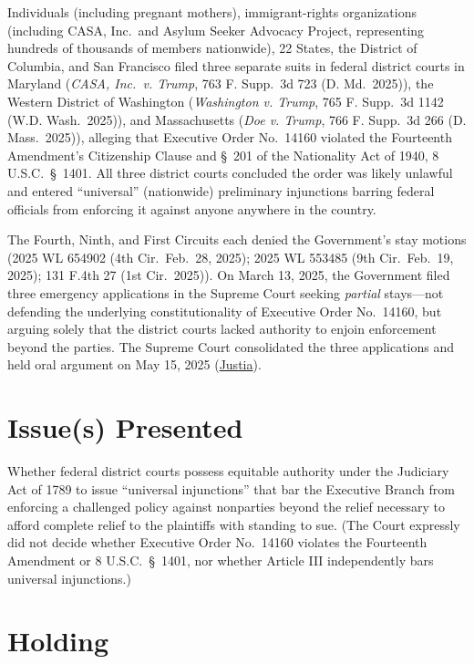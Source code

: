 \documentclass[12pt]{article}
\begin{document}
Individuals (including pregnant mothers), immigrant-rights organizations (including CASA, Inc.\ and Asylum Seeker Advocacy Project, representing hundreds of thousands of members nationwide), 22 States, the District of Columbia, and San Francisco filed three separate suits in federal district courts in Maryland (\textit{CASA, Inc.\ v. Trump}, 763 F. Supp.\ 3d 723 (D. Md.\ 2025)), the Western District of Washington (\textit{Washington v. Trump}, 765 F. Supp.\ 3d 1142 (W.D. Wash.\ 2025)), and Massachusetts (\textit{Doe v. Trump}, 766 F. Supp.\ 3d 266 (D. Mass.\ 2025)), alleging that Executive Order No.\ 14160 violated the Fourteenth Amendment's Citizenship Clause and \S\ 201 of the Nationality Act of 1940, 8 U.S.C.\ \S\ 1401. All three district courts concluded the order was likely unlawful and entered ``universal'' (nationwide) preliminary injunctions barring federal officials from enforcing it against anyone anywhere in the country.

The Fourth, Ninth, and First Circuits each denied the Government's stay motions (2025 WL 654902 (4th Cir.\ Feb.\ 28, 2025); 2025 WL 553485 (9th Cir.\ Feb.\ 19, 2025); 131 F.4th 27 (1st Cir.\ 2025)). On March 13, 2025, the Government filed three emergency applications in the Supreme Court seeking \textit{partial} stays---not defending the underlying constitutionality of Executive Order No.\ 14160, but arguing solely that the district courts lacked authority to enjoin enforcement beyond the parties. The Supreme Court consolidated the three applications and held oral argument on May 15, 2025 (\href{https://supreme.justia.com/cases/federal/us/606/24a884/}{Justia}).

\section{Issue(s) Presented}

Whether federal district courts possess equitable authority under the Judiciary Act of 1789 to issue ``universal injunctions'' that bar the Executive Branch from enforcing a challenged policy against nonparties beyond the relief necessary to afford complete relief to the plaintiffs with standing to sue. (The Court expressly did not decide whether Executive Order No.\ 14160 violates the Fourteenth Amendment or 8 U.S.C.\ \S\ 1401, nor whether Article III independently bars universal injunctions.)

\section{Holding}
\end{document}
